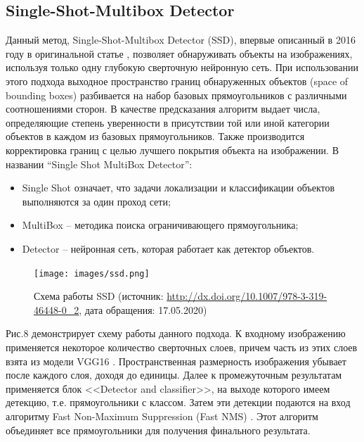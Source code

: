 \documentclass[14pt]{matmex-diploma-custom}
\begin{document}
    \subsection{Single-Shot-Multibox Detector}
        Данный метод, Single-Shot-Multibox Detector (SSD), впервые описанный в 2016 году в оригинальной статье \cite{SSD}, позволяет обнаруживать объекты на изображениях, используя только одну глубокую сверточную нейронную сеть. При использовании этого подхода выходное пространство границ обнаруженных объектов (space of bounding boxes) разбивается на набор базовых прямоугольников с различными соотношениями сторон. В качестве предсказания алгоритм выдает числа, определяющие степень уверенности в присутствии той или иной категории объектов в каждом из базовых прямоугольников. Также производится корректировка границ с целью лучшего покрытия объекта на изображении. 
            В названии  “Single Shot MultiBox Detector”:
            \begin{itemize}
                \item Single Shot означает, что задачи локализации и классификации объектов выполняются за один проход сети;
                \item MultiBox -- методика поиска ограничивающего прямоугольника;
                \item Detector --  нейронная сеть, которая работает как детектор объектов.
            \end{itemize}
            
            \begin{figure}[h]
                    \centering
                    \texttt{[image: images/ssd.png]}
                    \caption{Схема работы SSD (источник: \url{http://dx.doi.org/10.1007/978-3-319-46448-0_2}, дата обращения: 17.05.2020)}
            \end{figure}   
            Рис.8 демонстрирует схему работы данного подхода. К входному изображению применяется некоторое количество сверточных слоев, причем часть из этих слоев взята из модели VGG16 \cite{VGG:16}. Пространственная размерность изображения убывает после каждого слоя, доходя до единицы. Далее к промежуточным результатам применяется блок <<Detector and classifier>>, на выходе которого имеем детекцию, т.е. прямоугольники с классом. Затем эти детекции подаются на вход алгоритму Fast Non-Maximum Suppression (Fast NMS) \cite{non:maximum}. Этот алгоритм объединяет все прямоугольники для получения финального результата.
            
\end{document}
